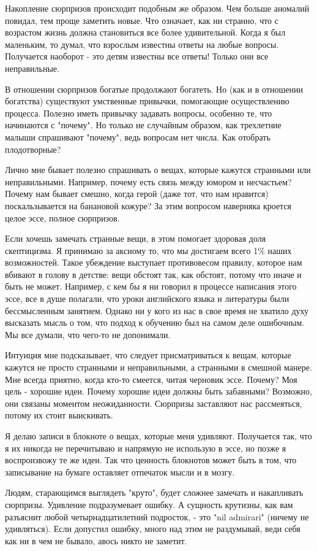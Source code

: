 \documentclass[ebook,12pt,oneside,openany]{memoir}
\begin{document}
Накопление сюрпризов происходит подобным же образом. Чем больше
аномалий повидал, тем проще заметить новые. Что означает, как ни
странно, что с возрастом жизнь должна становиться все более
удивительной. Когда я был маленьким, то думал, что взрослым известны
ответы на любые вопросы. Получается наоборот - это детям известны все
ответы! Только они все неправильные.

В отношении сюрпризов богатые продолжают богатеть. Но (как и в
отношении богатства) существуют умственные привычки, помогающие
осуществлению процесса. Полезно иметь привычку задавать вопросы,
особенно те, что начинаются с "почему". Но только не случайным
образом, как трехлетние малыши спрашивают "почему", ведь вопросам нет
числа. Как отобрать плодотворные?

Лично мне бывает полезно спрашивать о вещах, которые кажутся странными
или неправильными. Например, почему есть связь между юмором и
несчастьем? Почему нам бывает смешно, когда герой (даже тот, что нам
нравится) поскальзывается на банановой кожуре? За этим вопросом
наверняка кроется целое эссе, полное сюрпризов.

Если хочешь замечать странные вещи, в этом помогает здоровая доля
скептицизма. Я принимаю за аксиому то, что мы достигаем всего 1\%
наших возможностей. Такое убеждение выступает противовесом правилу,
которое нам вбивают в голову в детстве: вещи обстоят так, как обстоят,
потому что иначе и быть не может. Например, с кем бы я ни говорил в
процессе написания этого эссе, все в душе полагали, что уроки
английского языка и литературы были бессмысленным занятием. Однако ни
у кого из нас в свое время не хватило духу высказать мысль о том, что
подход к обучению был на самом деле ошибочным. Мы все думали, что
чего-то не допонимали.

Интуиция мне подсказывает, что следует присматриваться к вещам,
которые кажутся не просто странными и неправильными, а странными в
смешной манере. Мне всегда приятно, когда кто-то смеется, читая
черновик эссе. Почему? Моя цель - хорошие идеи. Почему хорошие идеи
должны быть забавными? Возможно, они связаны моментом неожиданности.
Сюрпризы заставляют нас рассмеяться, потому их стоит выискивать.

Я делаю записи в блокноте о вещах, которые меня удивляют. Получается
так, что я их никогда не перечитываю и напрямую не использую в эссе,
но позже я воспроизвожу те же идеи. Так что ценность блокнотов может
быть в том, что записывание на бумаге оставляет отпечаток мысли и в
мозгу.

Людям, старающимся выглядеть "круто", будет сложнее замечать и
накапливать сюрпризы. Удивление подразумевает ошибку. А сущность
крутизны, как вам разъяснит любой четырнадцатилетний подросток, - это
"nil admirari" (ничему не удивляться). Если допустил ошибку, много над
этим не раздумывай, веди себя как ни в чем не бывало, авось никто не
заметит.
\end{document}

